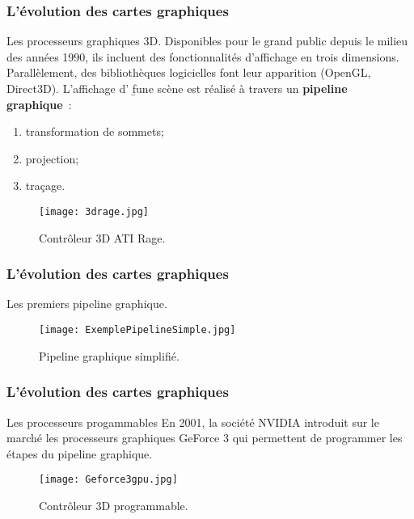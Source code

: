\begin{frame}
  \frametitle{L'évolution des cartes graphiques}
\begin{block}{Les processeurs graphiques 3D.}
    Disponibles pour le grand public depuis le milieu des années 1990, ils incluent des fonctionnalités
    d'affichage en trois dimensions. Parallèlement, des bibliothèques logicielles font leur apparition
    (OpenGL, Direct3D). L'affichage d' {\b fune scène} est réalisé à travers un {\bf pipeline graphique}~: 
        
        \begin{enumerate}
            \item transformation de sommets;
            \item projection;
            \item traçage.
        \end{enumerate}
    
    \begin{figure}[htbp]
        \centering
       \texttt{[image: 3drage.jpg]} 
        \caption{Contrôleur 3D ATI Rage.}
        \label{fig:ati_rage}
    \end{figure}
\end{block}
\end{frame}

\begin{frame}
  \frametitle{L'évolution des cartes graphiques}
\begin{block}{Les premiers pipeline graphique.}
    \begin{figure}[htbp]
        \centering
       \texttt{[image: ExemplePipelineSimple.jpg]} 
        \caption{Pipeline graphique simplifié.}
        \label{fig:pipeline}
    \end{figure}
\end{block}
\end{frame}


\begin{frame}
  \frametitle{L'évolution des cartes graphiques}
\begin{block}{Les processeurs progammables}
    En 2001, la société NVIDIA introduit sur le marché les processeurs graphiques
    GeForce 3 qui permettent de programmer les étapes du pipeline graphique. 
    \begin{figure}[htbp]
        \centering
       \texttt{[image: Geforce3gpu.jpg]} 
        \caption{Contrôleur 3D programmable.}
        \label{fig:geforce3}
    \end{figure}
\end{block}
\end{frame}

